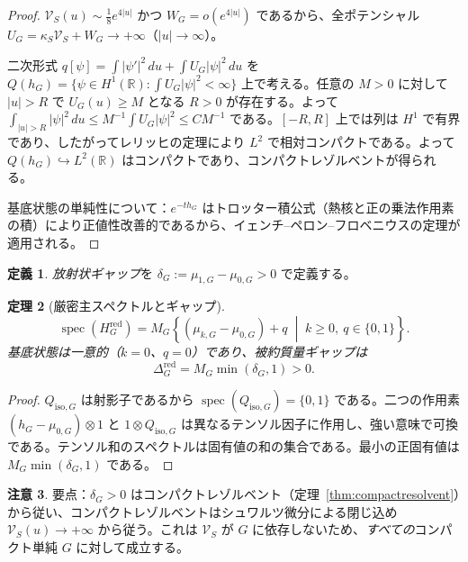 \documentclass[12pt]{article}
\theoremstyle{plain}
\newtheorem{theorem}{定理}[section]
\theoremstyle{definition}
\newtheorem{definition}[theorem]{定義}
\newtheorem{remark}[theorem]{注意}
\numberwithin{equation}{section}
\newcommand{\R}{\mathbb{R}}
\newcommand{\spec}{\operatorname{spec}}
\newcommand{\red}{\mathrm{red}}
\newcommand{\iso}{\mathrm{iso}}
\begin{document}
\begin{proof}
$\mathcal{V}_S(u)\sim\frac{1}{8}e^{4|u|}$ かつ $W_G=o(e^{4|u|})$ であるから、全ポテンシャル $U_G=\kappa_S\mathcal{V}_S+W_G\to+\infty$（$|u|\to\infty$）。

二次形式 $q[\psi]=\int|\psi'|^2\,du+\int U_G|\psi|^2\,du$ を $Q(h_G)=\{\psi\in H^1(\R):\int U_G|\psi|^2<\infty\}$ 上で考える。任意の $M>0$ に対して $|u|>R$ で $U_G(u)\geq M$ となる $R>0$ が存在する。よって $\int_{|u|>R}|\psi|^2\,du\leq M^{-1}\int U_G|\psi|^2\leq CM^{-1}$ である。$[-R,R]$ 上では列は $H^1$ で有界であり、したがってレリッヒの定理により $L^2$ で相対コンパクトである。よって $Q(h_G)\hookrightarrow L^2(\R)$ はコンパクトであり、コンパクトレゾルベントが得られる。

基底状態の単純性について：$e^{-th_G}$ はトロッター積公式（熱核と正の乗法作用素の積）により正値性改善的であるから、イェンチ--ペロン--フロベニウスの定理が適用される。
\end{proof}

\begin{definition}
\emph{放射状ギャップ}を $\delta_G := \mu_{1,G}-\mu_{0,G}>0$ で定義する。
\end{definition}

\begin{theorem}[厳密主スペクトルとギャップ]\label{thm:exactspectrum}
\begin{equation}
\spec(H_G^{\red}) = M_G\left\{(\mu_{k,G}-\mu_{0,G})+q \;\middle|\; k\geq 0,\ q\in\{0,1\}\right\}.
\end{equation}
基底状態は一意的（$k=0$、$q=0$）であり、被約質量ギャップは
\begin{equation}
\boxed{\Delta_G^{\red} = M_G\min(\delta_G,1) > 0.}
\end{equation}
\end{theorem}

\begin{proof}
$Q_{\iso,G}$ は射影子であるから $\spec(Q_{\iso,G})=\{0,1\}$ である。二つの作用素 $(h_G-\mu_{0,G})\otimes 1$ と $1\otimes Q_{\iso,G}$ は異なるテンソル因子に作用し、強い意味で可換である。テンソル和のスペクトルは固有値の和の集合である。最小の正固有値は $M_G\min(\delta_G,1)$ である。
\end{proof}

\begin{remark}
要点：$\delta_G>0$ はコンパクトレゾルベント（定理~\ref{thm:compactresolvent}）から従い、コンパクトレゾルベントはシュワルツ微分による閉じ込め $\mathcal{V}_S(u)\to+\infty$ から従う。これは $\mathcal{V}_S$ が $G$ に依存しないため、\emph{すべての}コンパクト単純 $G$ に対して成立する。
\end{remark}
\end{document}
